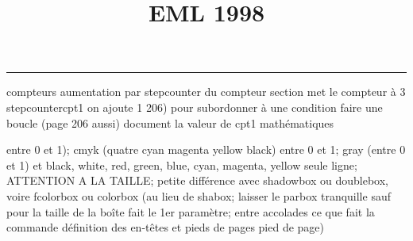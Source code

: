 \documentclass[11pt]{article}%
\title{\bf \vspace{-2cm} EML 1998} %
\author{} %
\date{} %
\renewcommand{\headrulewidth}{0pt}%
\renewcommand{\footrulewidth}{0.4pt}%
\begin{document}
\maketitle %
\vspace{-1.4cm}\hrule %
\thispagestyle{fancy}

\vspace*{.2cm}



compteurs%
aumentation par stepcounter du compteur section%
met le compteur à 3%
stepcounter{cpt1} on ajoute 1%
206) pour subordonner à une condition %
faire une boucle (page 206 aussi) %
document la valeur de cpt1 
mathématiques\newcommand{\ch}{\operatorname{ch}} 
\newcommand{\sh}{\operatorname{sh}}
\renewcommand{\tanh}{\operatorname{th}}
\renewcommand{\sinh}{\operatorname{sh}}
\renewcommand{\cosh}{\operatorname{ch}}
\newcommand{\argsh}{\operatorname{argsh}}
\newcommand{\argch}{\operatorname{argch}}
\newcommand{\argth}{\operatorname{argth}}
\newcommand{\ker}{\operatorname{Ker}}
\renewcommand{\im}{\operatorname{Im}}
\newcommand{\rg}{\operatorname{rg}}
\newcommand{\Id}{\operatorname{Id}}
\newcommand{\id}{\operatorname{id}}
\renewcommand{\leq}{\leq}
\renewcommand{\geq}{\geq }

entre 0 et 1); cmyk (quatre cyan magenta yellow black) entre 0 et 1;
gray (entre 0 et 1) et black, white, red, green, blue, cyan, magenta,
yellow%
seule ligne; ATTENTION A LA TAILLE; petite différence avec shadowbox ou
doublebox, voire fcolorbox ou colorbox (au lieu de shabox; laisser le
parbox tranquille sauf pour la taille de la boîte
\newcommand{\Tbox}[1]{\begin{center} \shabox{\parbox{0.6
\linewidth}{#1}} \end{center}} %
fait le 1er paramètre; entre accolades ce que fait la commande
définition des en-têtes et pieds de pages\pagestyle{fancy}
\chead{}
\rfoot[ \ \thepage]{\thepage}
\cfoot{}
\lfoot{}
\thispagestyle{fancy} %
pied de page)\renewcommand{\footrulewidth}{0.4pt}
\renewcommand{\headrulewidth}{0.4pt}
\end{document}
